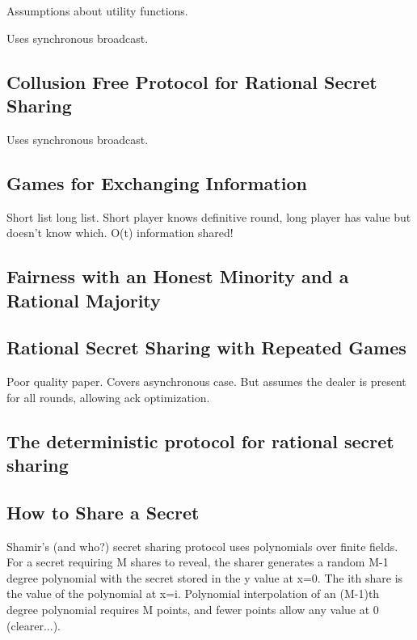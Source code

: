 \documentclass{article}
\begin{document}
Assumptions about utility functions.

Uses synchronous broadcast.

\subsection{Collusion Free Protocol for Rational Secret Sharing}

Uses synchronous broadcast.

\subsection{Games for Exchanging Information}

Short list long list. Short player knows definitive round, long player has value but doesn't know which. O(t) information shared!

\subsection{Fairness with an Honest Minority and a Rational Majority}

\subsection{Rational Secret Sharing with Repeated Games}
Poor quality paper.
Covers asynchronous case.
But assumes the dealer is present for all rounds, allowing ack optimization.

\subsection{The deterministic protocol for rational secret sharing}

\subsection{How to Share a Secret}
Shamir's (and who?) secret sharing protocol uses polynomials over finite fields. For a secret requiring M shares to reveal, the sharer generates a random M-1 degree polynomial with the secret stored in the y value at x=0. The ith share is the value of the polynomial at x=i. Polynomial interpolation of an (M-1)th degree polynomial requires M points, and fewer points allow any value at 0 (clearer...).
\end{document}
